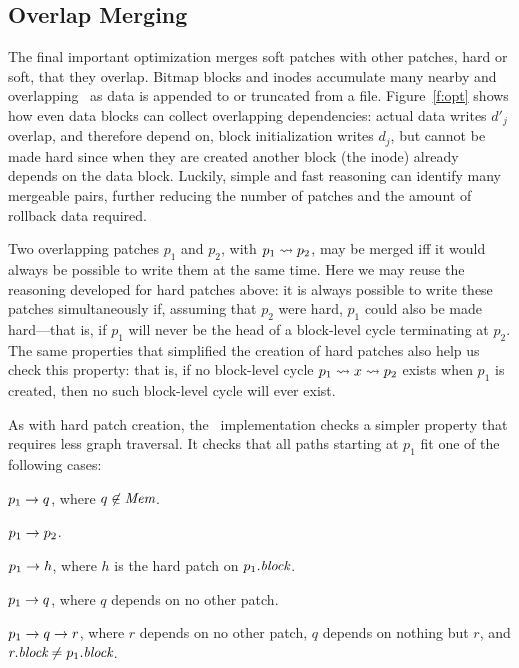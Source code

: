 \subsection{Overlap Merging}
\label{sec:chdescs:merge:overlap}

The final important optimization merges soft patches with other patches,
hard or soft, that they overlap.
%
Bitmap blocks and inodes accumulate many nearby and overlapping \chdescs\
as data is appended to or truncated from a file.
%
Figure~\ref{f:opt} shows how even data blocks can collect overlapping
dependencies: actual data writes $d'_j$ overlap, and therefore depend on,
block initialization writes $d_j$, but cannot be made hard since when they
are created another block (the inode) already depends on the data block.
%
Luckily, simple and fast reasoning can identify many mergeable pairs,
further reducing the number of patches and the amount of rollback data
required.


Two overlapping patches $p_1$ and $p_2$, with $p_1 \leadsto p_2$, may be
merged iff it would always be possible to write them at the same time.
%
Here we may reuse the reasoning developed for hard patches above: it is
always possible to write these patches simultaneously if, assuming that
$p_2$ were hard, $p_1$ could also be made hard---that is, if $p_1$ will
never be the head of a block-level cycle terminating at $p_2$.
%
The same properties that simplified the creation of hard patches also help
us check this property: that is, if no block-level cycle $p_1 \leadsto x
\leadsto p_2$ exists when $p_1$ is created, then no such block-level cycle
will ever exist.



As with hard patch creation, the \Kudos\ implementation checks a simpler
property that requires less graph traversal.
%
It checks that all paths starting at $p_1$ fit one of the following cases:

\begin{xcompactitemize}
\item $p_1 \rightarrow q$, where $q \not\in \PMem$.
\item $p_1 \rightarrow p_2$.
\item $p_1 \rightarrow h$, where $h$ is the hard patch on $p_1.\textit{block}$.
\item $p_1 \rightarrow q$, where $q$ depends on no other patch.
\item $p_1 \rightarrow q \rightarrow r$, where $r$ depends on no other patch,
  $q$ depends on nothing but $r$, and $r.\textit{block} \neq p_1.\textit{block}$.
\end{xcompactitemize}

